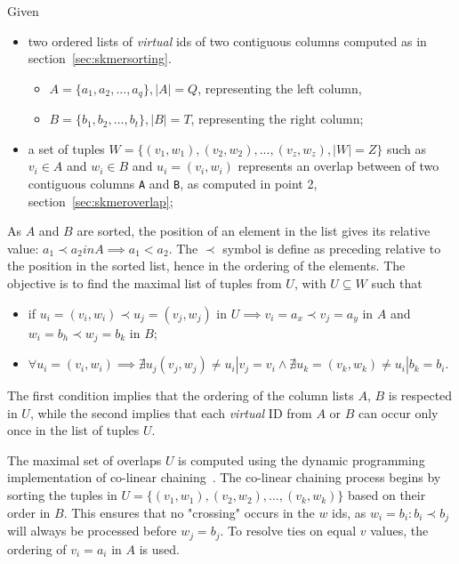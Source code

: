 \begin{definition}
	Given 
	\begin{itemize}
		\item two ordered lists of \emph{virtual} \skmer ids of two contiguous columns computed as in section~\ref{sec:skmersorting}.
		\begin{itemize}
			\item $ A = \{a_1, a_2, ..., a_q\}, |A| = Q $, representing the left column,
			\item $ B = \{b_1, b_2, ..., b_t\}, |B| = T $, representing the right column;
		\end{itemize}
		\item a set of tuples $ W = \{(v_1,w_1),(v_2,w_2), ..., (v_z,w_z), |W| = Z \}$ such as $ v_i \in A$ and $ w_i \in B$ and $ u_i = (v_i,w_i)$ represents an overlap between \kmers of two contiguous columns \texttt{A} and \texttt{B}, as computed in point 2, section~\ref{sec:skmeroverlap};
	\end{itemize}
	As $A$ and $B$ are sorted, the position of an element in the list gives its relative value: $a_1 \prec a_2 in A \implies a_1 < a_2$. The $\prec$ symbol is define as preceding relative to the position in the sorted list, hence in the ordering of the elements. The objective is to find the maximal list of tuples from $U$, with $U \subseteq W$ such that 
	\begin{itemize}
		\item if $ u_i = (v_i,w_i) \prec u_j =  (v_j,w_j)$ in $U \implies v_i = a_x \prec v_j = a_y $ in $A$ and $ w_i = b_h \prec w_j = b_k$ in $B$;
		\item $\forall u_i = (v_i,w_i) \implies \nexists u_j (v_j, w_j) \neq u_i | v_j = v_i \land \nexists u_k = (v_k, w_k) \neq u_i | b_k = b_i $.  
	\end{itemize}
	The first condition implies that the ordering of the column lists $A$, $B$ is respected in $U$, while the second implies that each \emph{virtual} \skmer ID from $A$ or $B$ can occur only once in the list of tuples $U$.
\end{definition}
The maximal set of overlaps $U$ is computed using the dynamic programming implementation of co-linear chaining~\cite{genome_scale}.
The co-linear chaining process begins by sorting the tuples in $U = \{(v_1,w_1),(v_2,w_2), ..., (v_k,w_k) \}$ based on their order in $B$. This ensures that no "crossing" occurs in the $w$ ids, as $w_i = b_i: b_i \prec b_j$ will always be processed before $w_j = b_j$. To resolve ties on equal $v$ values, the ordering of $v_i = a_i$ in $A$ is used.\\
